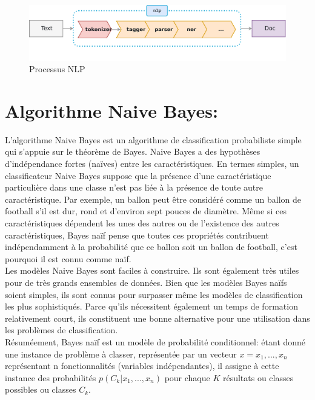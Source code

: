 \begin{figure}[H]
    \centering
    \includegraphics[width=\textwidth]{etude-theorique-conception/assets/nlp1.png}
    \caption{Processus NLP}
    \label{fig:my_label}
\end{figure}

\section{Algorithme Naive Bayes:}
L'algorithme Naive Bayes est un algorithme de classification probabiliste simple qui s'appuie sur le théorème de Bayes. Naive Bayes a des hypothèses d'indépendance fortes (naïves) entre les caractéristiques. En termes simples, un classificateur Naive Bayes suppose que la présence d'une caractéristique particulière dans une classe n'est pas liée à la présence de toute autre caractéristique. Par exemple, un ballon peut être considéré comme un ballon de football s'il est dur, rond et d'environ sept pouces de diamètre. Même si ces caractéristiques dépendent les unes des autres ou de l'existence des autres caractéristiques, Bayes naïf pense que toutes ces propriétés contribuent indépendamment à la probabilité que ce ballon soit un ballon de football, c'est pourquoi il est connu comme naïf. \\

Les modèles Naive Bayes sont faciles à construire. Ils sont également très utiles pour de très grands ensembles de données. Bien que les modèles Bayes naïfs soient simples, ils sont connus pour surpasser même les modèles de classification les plus sophistiqués. Parce qu'ils nécessitent également un temps de formation relativement court, ils constituent une bonne alternative pour une utilisation dans les problèmes de classification. \\

Résuméement, Bayes naïf est un modèle de probabilité conditionnel: étant donné une instance de problème à classer, représentée par un vecteur $x=x_{1},...,x_{n}$  représentant n fonctionnalités (variables indépendantes), il assigne à cette instance des probabilités ${p(C_{k}| x_{1},...,x_{n})}$ pour chaque $K$ résultats ou classes possibles ou classes $C_{k}$. \cite{murty2011pattern} \\

